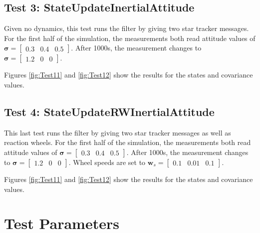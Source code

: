 \subsection{Test 3: StateUpdateInertialAttitude}

Given no dynamics, this test runs the filter by giving two star tracker messages. For the first half of the simulation, the measurements both read attitude values of $\bm \sigma =  \begin{bmatrix} 0.3 & 0.4 & 0.5 \end{bmatrix}$. After 1000s, the measurement changes to $\bm \sigma = \begin{bmatrix} 1.2 & 0 & 0 \end{bmatrix}$.

Figures \ref{fig:Test11} and \ref{fig:Test12} show the results for the states and covariance values. 
 
 
 
\subsection{Test 4: StateUpdateRWInertialAttitude}

This last test runs the filter by giving two star tracker messages as well as reaction wheels. For the first half of the simulation, the measurements both read attitude values of $\bm \sigma = \begin{bmatrix} 0.3 & 0.4 & 0.5 \end{bmatrix}$. After 1000s, the measurement changes to $\bm \sigma = \begin{bmatrix} 1.2 & 0 & 0 \end{bmatrix}$. Wheel speeds are set to $\bm w_s = \begin{bmatrix} 0.1& 0.01& 0.1\end{bmatrix}$.

Figures \ref{fig:Test11} and \ref{fig:Test12} show the results for the states and covariance values. 
 
 

\section{Test Parameters}

